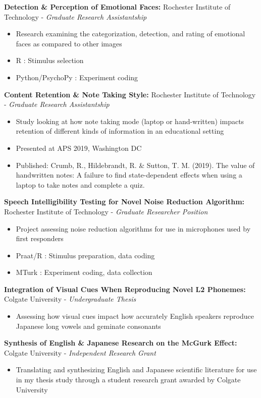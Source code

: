 \documentclass[a4paper,9pt]{extarticle}
\begin{document}
\noindent
\textbf{Detection \& Perception of Emotional Faces:}
Rochester Institute of Technology - \textit{Graduate Research Assistantship}
\begin{itemize}
\item Research examining the categorization, detection, and rating of emotional faces as compared to other images
\item R : Stimulus selection
\item Python/PsychoPy : Experiment coding
\end{itemize}

\noindent
\textbf{Content Retention \& Note Taking Style:}
Rochester Institute of Technology - \textit{Graduate Research Assistantship}
\begin{itemize}
\item Study looking at how note taking mode (laptop or hand-written) impacts retention of different kinds of information in an educational setting
\item Presented at APS 2019, Washington DC
\item Published: Crumb, R., Hildebrandt, R. \& Sutton, T. M. (2019). The value of handwritten notes: A failure to find state-dependent effects when using a laptop to take notes and complete a quiz.
\end{itemize}

\noindent
\textbf{Speech Intelligibility Testing for Novel Noise Reduction Algorithm:}
Rochester Institute of Technology - \textit{Graduate Researcher Position}
\begin{itemize}
\item Project assessing noise reduction algorithms for use in microphones used by first responders
\item Praat/R : Stimulus preparation, data coding
\item MTurk : Experiment coding, data collection
\end{itemize}

\noindent
\textbf{Integration of Visual Cues When Reproducing Novel L2 Phonemes:}
Colgate University - \textit{Undergraduate Thesis}
\begin{itemize}
\item Assessing how visual cues impact how accurately English speakers reproduce Japanese long vowels and geminate consonants
\end{itemize}

\noindent
\textbf{Synthesis of English \& Japanese Research on the McGurk Effect:}
Colgate University - \textit{Independent Research Grant}
\begin{itemize}
\item Translating and synthesizing English and Japanese scientific literature for use in my thesis study through a student research grant awarded by Colgate University
\end{itemize}
\end{document}
